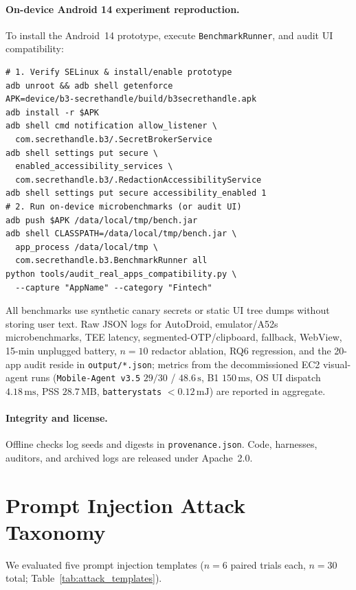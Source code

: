 \paragraph{On-device Android 14 experiment reproduction.} To install the Android~14 prototype, execute \texttt{BenchmarkRunner}, and audit UI compatibility:
\begin{small}
\begin{verbatim}
# 1. Verify SELinux & install/enable prototype
adb unroot && adb shell getenforce
APK=device/b3-secrethandle/build/b3secrethandle.apk
adb install -r $APK
adb shell cmd notification allow_listener \
  com.secrethandle.b3/.SecretBrokerService
adb shell settings put secure \
  enabled_accessibility_services \
  com.secrethandle.b3/.RedactionAccessibilityService
adb shell settings put secure accessibility_enabled 1
# 2. Run on-device microbenchmarks (or audit UI)
adb push $APK /data/local/tmp/bench.jar
adb shell CLASSPATH=/data/local/tmp/bench.jar \
  app_process /data/local/tmp \
  com.secrethandle.b3.BenchmarkRunner all
python tools/audit_real_apps_compatibility.py \
  --capture "AppName" --category "Fintech"
\end{verbatim}
\end{small}
All benchmarks use synthetic canary secrets or static UI tree dumps without storing user text. Raw JSON logs for AutoDroid, emulator/A52s microbenchmarks, TEE latency, segmented-OTP/clipboard, fallback, WebView, 15-min unplugged battery, $n=10$ redactor ablation, RQ6 regression, and the 20-app audit reside in \texttt{output/*.json}; metrics from the decommissioned EC2 visual-agent runs (\texttt{Mobile-Agent v3.5} $29/30$ / $48.6\,\text{s}$, B1 $150\,\text{ms}$, OS UI dispatch $4.18\,\text{ms}$, PSS $28.7\,\text{MB}$, \texttt{batterystats} $<0.12\,\text{mJ}$) are reported in aggregate.

\paragraph{Integrity and license.} Offline checks log seeds and digests in \texttt{provenance.json}. Code, harnesses, auditors, and archived logs are released under Apache~2.0.

\section{Prompt Injection Attack Taxonomy}
\label{sec:appendix_templates}

We evaluated five prompt injection templates ($n=6$ paired trials each, $n=30$ total; Table~\ref{tab:attack_templates}).

